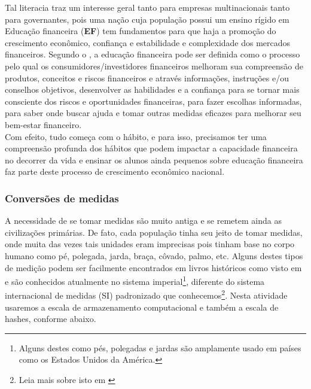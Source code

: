  Tal literacia traz um interesse geral tanto para empresas multinacionais tanto para governantes, pois uma nação cuja população possui um ensino rígido em Educação financeira (\textbf{EF}) tem fundamentos para que haja a promoção do crescimento econômico, confiança e estabilidade e complexidade dos mercados financeiros.  Segundo o \cite{OCDE}, a educação financeira pode ser definida como o processo pelo qual os consumidores/investidores financeiros melhoram sua compreensão de produtos, conceitos e riscos financeiros e através informações, instruções e/ou conselhos objetivos, desenvolver as habilidades e a confiança para se tornar mais consciente dos riscos e oportunidades financeiras, para fazer escolhas informadas, para saber onde buscar ajuda e tomar outras medidas eficazes para melhorar seu bem-estar financeiro. \\	

Com efeito, tudo começa com o hábito, e para isso, precisamos
ter uma compreensão profunda dos hábitos que podem impactar a capacidade financeira no decorrer da vida e ensinar os alunos ainda pequenos sobre educação financeira faz parte deste processo de crescimento econômico nacional.

\subsubsection{Conversões de medidas} 
A necessidade de se tomar medidas são muito antiga e se remetem ainda as civilizações primárias. De fato, cada população tinha seu jeito de tomar medidas, onde muita das vezes tais unidades eram imprecisas pois tinham base no corpo humano como pé, polegada, jarda, braça, côvado, palmo, etc. Alguns destes tipos de medição podem ser facilmente encontrados em livros históricos como visto em \cite{CUNHA} e são conhecidos atualmente no sistema imperial\footnote{Alguns destes como  pés, polegadas e jardas são amplamente usado em países como os Estados Unidos da América.}, diferente do sistema internacional de medidas (SI) padronizado que conhecemos\footnote{Leia mais sobre isto em \cite{LEGER}}. Nesta atividade usaremos a escala de armazenamento computacional  e também a escala de hashes, conforme abaixo. 

